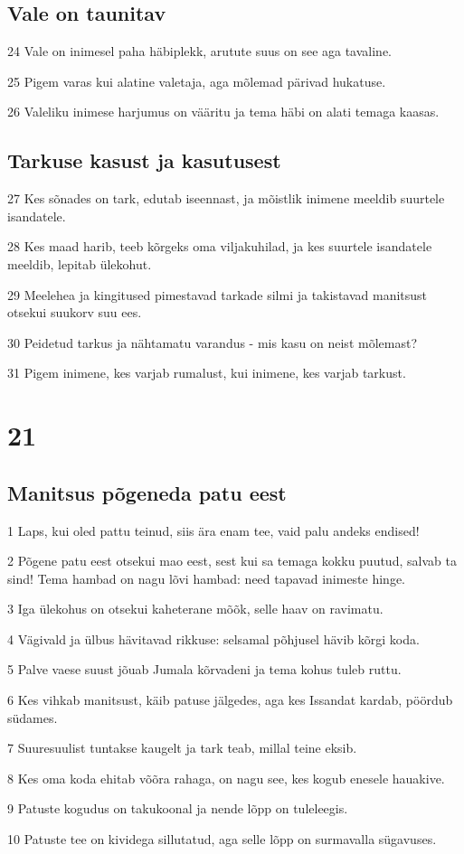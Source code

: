 \section*{Vale on taunitav}

\par 24 Vale on inimesel paha häbiplekk, arutute suus on see aga tavaline.
\par 25 Pigem varas kui alatine valetaja, aga mõlemad pärivad hukatuse.
\par 26 Valeliku inimese harjumus on vääritu ja tema häbi on alati temaga kaasas.

\section*{Tarkuse kasust ja kasutusest}

\par 27 Kes sõnades on tark, edutab iseennast, ja mõistlik inimene meeldib suurtele isandatele.
\par 28 Kes maad harib, teeb kõrgeks oma viljakuhilad, ja kes suurtele isandatele meeldib, lepitab ülekohut.
\par 29 Meelehea ja kingitused pimestavad tarkade silmi ja takistavad manitsust otsekui suukorv suu ees.
\par 30 Peidetud tarkus ja nähtamatu varandus - mis kasu on neist mõlemast?
\par 31 Pigem inimene, kes varjab rumalust, kui inimene, kes varjab tarkust.

\chapter{21}

\section*{Manitsus põgeneda patu eest}

\par 1 Laps, kui oled pattu teinud, siis ära enam tee, vaid palu andeks endised!
\par 2 Põgene patu eest otsekui mao eest, sest kui sa temaga kokku puutud, salvab ta sind! Tema hambad on nagu lõvi hambad: need tapavad inimeste hinge.
\par 3 Iga ülekohus on otsekui kaheterane mõõk, selle haav on ravimatu.
\par 4 Vägivald ja ülbus hävitavad rikkuse: selsamal põhjusel hävib kõrgi koda.
\par 5 Palve vaese suust jõuab Jumala kõrvadeni ja tema kohus tuleb ruttu.
\par 6 Kes vihkab manitsust, käib patuse jälgedes, aga kes Issandat kardab, pöördub südames.
\par 7 Suuresuulist tuntakse kaugelt ja tark teab, millal teine eksib.
\par 8 Kes oma koda ehitab võõra rahaga, on nagu see, kes kogub enesele hauakive.
\par 9 Patuste kogudus on takukoonal ja nende lõpp on tuleleegis.
\par 10 Patuste tee on kividega sillutatud, aga selle lõpp on surmavalla sügavuses.

